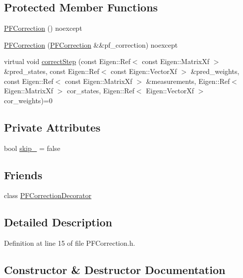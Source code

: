 \subsection*{Protected Member Functions}
\begin{DoxyCompactItemize}
\item 
\mbox{\hyperlink{classbfl_1_1PFCorrection_ae4be8c44771f209d79c549305cb63dcf}{P\+F\+Correction}} () noexcept
\item 
\mbox{\hyperlink{classbfl_1_1PFCorrection_a95a379a1b622c782020bdd06c59cca3f}{P\+F\+Correction}} (\mbox{\hyperlink{classbfl_1_1PFCorrection}{P\+F\+Correction}} \&\&pf\+\_\+correction) noexcept
\item 
virtual void \mbox{\hyperlink{classbfl_1_1PFCorrection_a3fb61b90d36bea3271c1c9e363c61229}{correct\+Step}} (const Eigen\+::\+Ref$<$ const Eigen\+::\+Matrix\+Xf $>$ \&pred\+\_\+states, const Eigen\+::\+Ref$<$ const Eigen\+::\+Vector\+Xf $>$ \&pred\+\_\+weights, const Eigen\+::\+Ref$<$ const Eigen\+::\+Matrix\+Xf $>$ \&measurements, Eigen\+::\+Ref$<$ Eigen\+::\+Matrix\+Xf $>$ cor\+\_\+states, Eigen\+::\+Ref$<$ Eigen\+::\+Vector\+Xf $>$ cor\+\_\+weights)=0
\end{DoxyCompactItemize}
\subsection*{Private Attributes}
\begin{DoxyCompactItemize}
\item 
bool \mbox{\hyperlink{classbfl_1_1PFCorrection_aac7b1063a3207bd00547ad5490bbc935}{skip\+\_\+}} = false
\end{DoxyCompactItemize}
\subsection*{Friends}
\begin{DoxyCompactItemize}
\item 
class \mbox{\hyperlink{classbfl_1_1PFCorrection_a58497dd469f7041f127774bccdc78022}{P\+F\+Correction\+Decorator}}
\end{DoxyCompactItemize}


\subsection{Detailed Description}


Definition at line 15 of file P\+F\+Correction.\+h.



\subsection{Constructor \& Destructor Documentation}
\mbox{\label{classbfl_1_1PFCorrection_aa26f1c91715ebccc1d3c25f673d32279}} 
